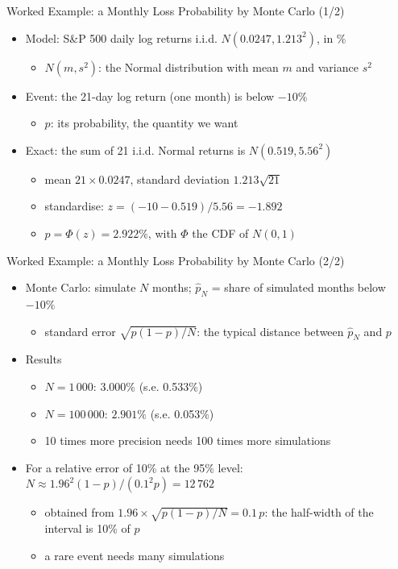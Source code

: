 \begin{frame}{Worked Example: a Monthly Loss Probability by Monte Carlo (1/2)}
\itemsize{\small}
\begin{itemize}
    \item Model: S\&P 500 daily log returns i.i.d. $N(0.0247, 1.213^2)$, in \%
    \begin{itemize}
        \item $N(m, s^2)$: the Normal distribution with mean $m$ and variance $s^2$
    \end{itemize}
    \item Event: the 21-day log return (one month) is below $-10\%$
    \begin{itemize}
        \item $p$: its probability, the quantity we want
    \end{itemize}
    \item Exact: the sum of 21 i.i.d. Normal returns is $N(0.519, 5.56^2)$
    \begin{itemize}
        \item mean $21 \times 0.0247$, standard deviation $1.213\sqrt{21}$
        \item standardise: $z = (-10 - 0.519)/5.56 = -1.892$
        \item $p = \Phi(z) = 2.922\%$, with $\Phi$ the CDF of $N(0, 1)$
    \end{itemize}
\end{itemize}
\end{frame}

\begin{frame}{Worked Example: a Monthly Loss Probability by Monte Carlo (2/2)}
\itemsize{\small}
\begin{itemize}
    \item Monte Carlo: simulate $N$ months; $\hat p_N$ = share of simulated months below $-10\%$
    \begin{itemize}
        \item standard error $\sqrt{p(1 - p)/N}$: the typical distance between $\hat p_N$ and $p$
    \end{itemize}
    \item Results
    \begin{itemize}
        \item $N = 1\,000$: $3.000\%$ (s.e. 0.533\%)
        \item $N = 100\,000$: $2.901\%$ (s.e. 0.053\%)
        \item 10 times more precision needs 100 times more simulations
    \end{itemize}
    \item For a relative error of 10\% at the 95\% level: $N \approx 1.96^2(1 - p)/(0.1^2 p) = 12\,762$
    \begin{itemize}
        \item obtained from $1.96 \times \sqrt{p(1 - p)/N} = 0.1\,p$: the half-width of the interval is 10\% of $p$
        \item a rare event needs many simulations
    \end{itemize}
\end{itemize}
\end{frame}


